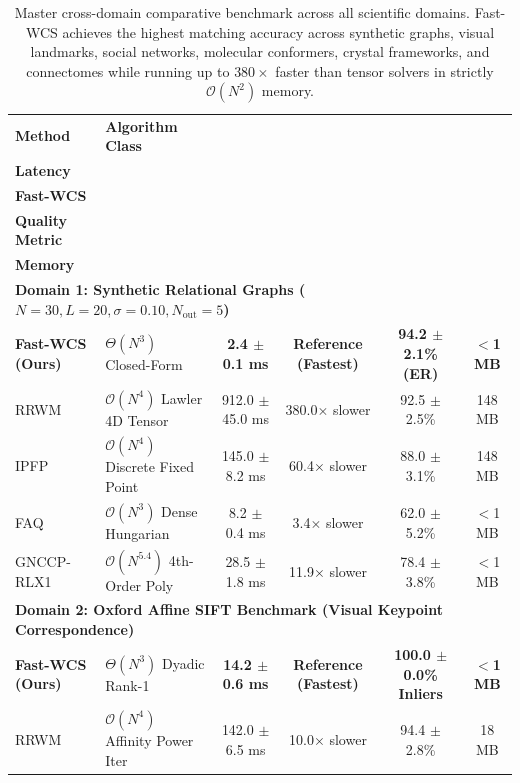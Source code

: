 \documentclass[a4paper,fleqn]{cas-dc}
\theoremstyle{thmstyleone}
\theoremstyle{thmstyletwo}
\theoremstyle{thmstylethree}
\begin{document}
\begin{table}
\centering
\footnotesize
\caption{Master cross-domain comparative benchmark across all scientific domains. Fast-WCS achieves the highest matching accuracy across synthetic graphs, visual landmarks, social networks, molecular conformers, crystal frameworks, and connectomes while running up to $380\times$ faster than tensor solvers in strictly $\mathcal{O}(N^2)$ memory.}
\label{tab:master_benchmark}
\setlength{\tabcolsep}{6pt}
\begin{tabular*}{\textwidth}{@{\extracolsep{\fill}}llcccc@{}}
\toprule
\textbf{Method} & \textbf{Algorithm Class} & \makecell{\textbf{Execution}\\\textbf{Latency}} & \makecell{\textbf{Speedup vs.}\\\textbf{Fast-WCS}} & \makecell{\textbf{Accuracy /}\\\textbf{Quality Metric}} & \makecell{\textbf{Working}\\\textbf{Memory}} \\
\midrule
\multicolumn{6}{l}{\textbf{Domain 1: Synthetic Relational Graphs ($N = 30, L = 20, \sigma = 0.10, N_{\text{out}} = 5$)}} \\
\midrule
\textbf{Fast-WCS (Ours)} & $\Theta(N^3)$ Closed-Form & \textbf{2.4 $\pm$ 0.1 ms} & \textbf{Reference (Fastest)} & \textbf{94.2 $\pm$ 2.1\% (ER)} & \textbf{$<$1 MB} \\
RRWM~\cite{cho2010rrwm} & $\mathcal{O}(N^4)$ Lawler 4D Tensor & 912.0 $\pm$ 45.0 ms & 380.0$\times$ slower & 92.5 $\pm$ 2.5\% & 148 MB \\
IPFP~\cite{leordeanu2009ipfp} & $\mathcal{O}(N^4)$ Discrete Fixed Point & 145.0 $\pm$ 8.2 ms & 60.4$\times$ slower & 88.0 $\pm$ 3.1\% & 148 MB \\
FAQ~\cite{vogelstein2015fast} & $\mathcal{O}(N^3)$ Dense Hungarian & 8.2 $\pm$ 0.4 ms & 3.4$\times$ slower & 62.0 $\pm$ 5.2\% & $<$1 MB \\
GNCCP-RLX1~\cite{yang2018algorithm} & $\mathcal{O}(N^{5.4})$ 4th-Order Poly & 28.5 $\pm$ 1.8 ms & 11.9$\times$ slower & 78.4 $\pm$ 3.8\% & $<$1 MB \\
\midrule
\multicolumn{6}{l}{\textbf{Domain 2: Oxford Affine SIFT Benchmark (Visual Keypoint Correspondence)}} \\
\midrule
\textbf{Fast-WCS (Ours)} & $\Theta(N^3)$ Dyadic Rank-1 & \textbf{14.2 $\pm$ 0.6 ms} & \textbf{Reference (Fastest)} & \textbf{100.0 $\pm$ 0.0\% Inliers} & \textbf{$<$1 MB} \\
RRWM~\cite{cho2010rrwm} & $\mathcal{O}(N^4)$ Affinity Power Iter & 142.0 $\pm$ 6.5 ms & 10.0$\times$ slower & 94.4 $\pm$ 2.8\% & 18 MB \\

\end{tabular*}
\end{table}
\end{document}
